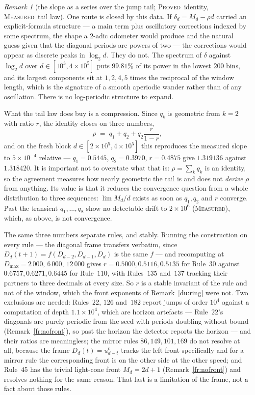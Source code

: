 \documentclass[11pt]{article}
\theoremstyle{definition}
\theoremstyle{remark}
\newtheorem{remark}[theorem]{Remark}
\newcommand{\PROVED}{\textsc{Proved}}
\newcommand{\MEASURED}{\textsc{Measured}}
\begin{document}
\begin{remark}[the slope as a series over the jump tail; \PROVED\ identity, \MEASURED\ tail law]
One route is closed by this data. If $\delta_d=M_d-\rho d$ carried an explicit-formula structure ---
a main term plus oscillatory corrections indexed by some spectrum, the shape a $2$-adic odometer would
produce and the natural guess given that the diagonal periods are powers of two --- the corrections
would appear as discrete peaks in $\log_2d$. They do not. The spectrum of $\delta$ against $\log_2 d$
over $d\in[10^{3},4\times10^{5}]$ puts $99.81\%$ of its power in the lowest $200$ bins, and its largest
components sit at $1,2,4,5$ times the reciprocal of the window length, which is the signature of a
smooth aperiodic wander rather than of any oscillation. There is no log-periodic structure to expand.

What the tail law does buy is a compression. Since $q_k$ is geometric from $k=2$ with ratio $r$, the
identity closes on three numbers,
\[
\rho \;=\; q_1+q_2+q_2\frac{r}{1-r},
\]
and on the fresh block $d\in[2\times10^{5},4\times10^{5}]$ this reproduces the measured slope to
$5\times10^{-4}$ relative --- $q_1=0.5445$, $q_2=0.3970$, $r=0.4875$ give $1.319136$ against $1.318420$.
It is important not to overstate what that is: $\rho=\sum_kq_k$ is an identity, so the agreement measures
how nearly geometric the tail is and does not \emph{derive} $\rho$ from anything. Its value is that it
reduces the convergence question from a whole distribution to three sequences: $\lim M_d/d$ exists as
soon as $q_1,q_2$ and $r$ converge. Past the transient $q_1,\dots,q_8$ show no detectable drift to
$2\times10^{6}$ (\MEASURED), which, as above, is not convergence.

The same three numbers separate rules, and stably. Running the construction on every rule --- the
diagonal frame transfers verbatim, since $D_d(t+1)=f(D_{d-2},D_{d-1},D_d)$ is the same $f$ --- and
recomputing at $D_{\max}=2\,000,\,6\,000,\,12\,000$ gives $r=0.5000,0.5116,0.5135$ for Rule~30 against
$0.6757,0.6271,0.6445$ for Rule~$110$, with Rules~$135$ and~$137$ tracking their partners to three
decimals at every size. So $r$ is a stable invariant of the rule and not of the window, which the front
exponents of Remark~\ref{du:ring} were not. Two exclusions are needed: Rules~$22$, $126$ and~$182$
report jumps of order $10^{4}$ against a computation of depth $1.1\times10^{4}$, which are horizon artefacts --- Rule~$22$'s
diagonals are purely periodic from the seed with periods doubling without bound (Remark~\ref{fr:nofront}), so past the
horizon the detector reports the horizon --- and their ratios are meaningless; the mirror rules $86,149,101,169$ do not resolve at all,
because the frame $D_d(t)=u^t_{d-t}$ tracks the left front specifically and for a mirror rule the
corresponding front is on the other side at the other speed; and Rule~$45$ has the trivial light-cone front $M_d=2d+1$
(Remark~\ref{fr:nofront}) and resolves nothing for the same reason. That last is a limitation of the frame, not
a fact about those rules.
\end{remark}
\end{document}
